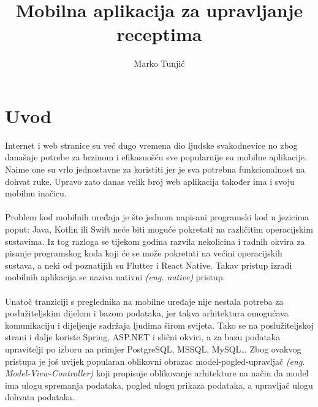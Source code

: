 \documentclass[times, utf8, zavrsni]{fer}
\begin{document}

\title{Mobilna aplikacija za upravljanje receptima}

\author{Marko Tunjić}

\maketitle

\zahvala{}

\tableofcontents

\chapter{Uvod}
Internet i web stranice su već dugo vremena dio ljudske svakodnevice no zbog
današnje potrebe za brzinom i efikasnošću sve popularnije su mobilne aplikacije. Naime one
su vrlo jednostavne za koristiti jer je sva potrebna funkcionalnost na dohvat ruke.
Upravo zato danas velik broj web aplikacija
također ima i svoju mobilnu inačicu.
\\\\
Problem kod mobilnih uređaja je što jednom napisani programski kod u jezicima poput:
Java, Kotlin ili Swift neće biti moguće pokretati na različitim operacijskim sustavima.
Iz tog razloga se tijekom godina razvila nekolicina
i radnih okvira za pisanje programskog koda koji će se može pokretati
na većini operacijskih sustava, a neki od poznatijih su Flutter i React Native.
Takav pristup izradi mobilnih aplikacija se naziva nativni \textit{(eng. native)} pristup.
\\\\
Unatoč tranziciji s preglednika na mobilne uređaje nije nestala potreba
za poslužiteljskim dijelom i bazom podataka, jer takva arhitektura omogućava
komunikaciju i dijeljenje sadržaja ljudima širom svijeta. Tako se na
poslužiteljskoj strani i dalje koriste Spring, ASP.NET i slični okviri,
a za bazu podataka upravitelji po izboru na primjer PostgreSQL, MSSQL, MySQL\dots
Zbog ovakvog pristupa je još uvijek popularan oblikovni obrazac model-pogled-upravljač \textit{(eng. Model-View-Controller)}
koji propisuje oblikovanje arhitekture na način da model ima ulogu
spremanja podataka, pogled ulogu prikaza podataka, a upravljač ulogu dohvata podataka.
\\\\
\end{document}
